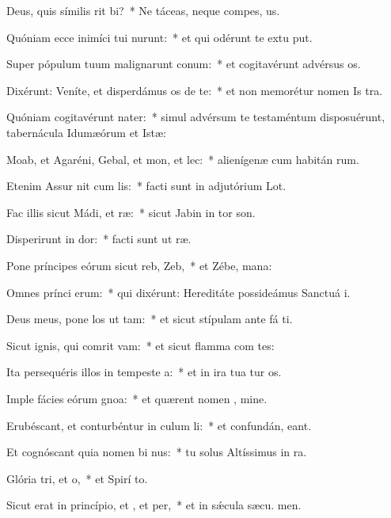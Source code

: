 \item Deus, quis símilis rit bi?~* Ne táceas, neque compes, us.
\item Quóniam ecce inimíci tui nurunt:~* et qui odérunt te extu put.
\item Super pópulum tuum malignarunt conum:~* et cogitavérunt advérsus  os.
\item Dixérunt: Veníte, et disperdámus os de te:~* et non memorétur nomen Is tra.
\item Quóniam cogitavérunt nater:~* simul advérsum te testaméntum disposuérunt, tabernácula Idumæórum et Istæ:
\item Moab, et Agaréni, Gebal, et mon, et lec:~* alienígenæ cum habitán rum.
\item Etenim Assur nit cum lis:~* facti sunt in adjutórium  Lot.
\item Fac illis sicut Mádi, et ræ:~* sicut Jabin in tor son.
\item Disperirunt in dor:~* facti sunt ut  ræ.
\item Pone príncipes eórum sicut reb,  Zeb,~* et Zébe,  mana:
\item Omnes prínci erum:~* qui dixérunt: Hereditáte possideámus Sanctuá i.
\item Deus meus, pone los ut tam:~* et sicut stípulam ante fá ti.
\item Sicut ignis, qui comrit vam:~* et sicut flamma com tes:
\item Ita persequéris illos in tempeste a:~* et in ira tua tur os.
\item Imple fácies eórum gnoa:~* et quærent nomen , mine.
\item Erubéscant, et conturbéntur in culum li:~* et confundán,  eant.
\item Et cognóscant quia nomen bi nus:~* tu solus Altíssimus in  ra.
\item Glória tri, et o,~* et Spirí to.
\item Sicut erat in princípio, et , et per,~* et in sǽcula sæcu. men.

